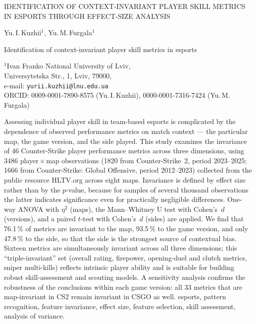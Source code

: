 
\begin{Title}
IDENTIFICATION OF CONTEXT-INVARIANT PLAYER SKILL METRICS IN ESPORTS
THROUGH EFFECT-SIZE ANALYSIS
\end{Title}

\begin{Authors}
Yu.\,I.\,Kuzhii$^{1}$, Yu.\,M.\,Furgala$^{1}$
\end{Authors}

{Identification of context-invariant player skill metrics in esports}

\begin{Organization}
$^{1}$Ivan Franko National University of Lviv,\\
Universytetska Str., 1, Lviv, 79000,\\
e-mail: \texttt{yurii.kuzhii@lnu.edu.ua}\\
ORCID: 0009-0001-7890-8575 (Yu.\,I.\,Kuzhii), 0000-0001-7316-7424 (Yu.\,M.\,Furgala)
\end{Organization}

\begin{Abstract}
Assessing individual player skill in team-based esports is complicated by the dependence of
observed performance metrics on match context --- the particular map, the game version, and the
side played. This study examines the invariance of 46 Counter-Strike player performance metrics
across three dimensions, using 3486 player\,$\times$\,map observations (1820 from
Counter-Strike~2, period 2023--2025; 1666 from Counter-Strike: Global Offensive, period
2012--2023) collected from the public resource HLTV.org across eight maps. Invariance is defined
by effect size rather than by the $p$-value, because for samples of several thousand observations
the latter indicates significance even for practically negligible differences. One-way ANOVA with
$\eta^2$ (maps), the Mann--Whitney U test with Cohen's~$d$ (versions), and a paired $t$-test with
Cohen's~$d$ (sides) are applied. We find that 76.1\,\% of metrics are invariant to the map,
93.5\,\% to the game version, and only 47.8\,\% to the side, so that the side is the strongest
source of contextual bias. Sixteen metrics are simultaneously invariant across all three
dimensions; this ``triple-invariant'' set (overall rating, firepower, opening-duel and clutch
metrics, sniper multi-kills) reflects intrinsic player ability and is suitable for building robust
skill-assessment and scouting models. A sensitivity analysis confirms the robustness of the
conclusions within each game version: all 33 metrics that are map-invariant in CS2 remain
invariant in CSGO as well.
\KeywordsEng
esports, pattern recognition, feature invariance, effect size, feature selection,
skill assessment, analysis of variance.
\end{Abstract}


